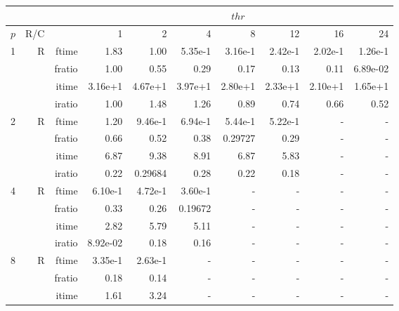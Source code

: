 \documentclass[a4paper]{article}
\begin{document}
\begin{table}[htbp]
\begin{center}
\begin{small}
\begin{tabular}{|r|r|r|r|r|r|r|r|r|r|}
\hline 
     & & & \multicolumn{7}{c|}{$thr$} \\ \hline
    $p$ & R/C &  & 1           & 2    & 4    & 8    & 12   & 16    & 24  \\ \hline\hline
   1 &  R &   ftime &    1.83  &    1.00 &    5.35e-1 &    3.16e-1 &    2.42e-1 &    2.02e-1 &    1.26e-1 \\
             &             &  fratio &    1.00 &    0.55 &    0.29 &    0.17 &    0.13 &    0.11 &    6.89e-02\\
             &             &  itime &    3.16e+1 &   4.67e+1 &   3.97e+1 &   2.80e+1 &   2.33e+1 &   2.10e+1 &   1.65e+1 \\
             &             &  iratio &    1.00 &    1.48  &    1.26  &   0.89 &    0.74 &    0.66 &    0.52 \\\hline
   2 &  R &   ftime &    1.20  &    9.46e-1 &    6.94e-1 &    5.44e-1 &    5.22e-1 &      - &      - \\
             &             &  fratio &    0.66 &   0.52 &    0.38 &    0.29727 &   0.29 &      - &      - \\
             &             &  itime &    6.87  &    9.38  &    8.91  &    6.87  &    5.83  &      - &      - \\
             &             &  iratio &   0.22 &    0.29684 &    0.28 &   0.22 &    0.18 &      - &      - \\\hline
   4 &  R &   ftime &    6.10e-1 &    4.72e-1 &    3.60e-1 &      - &      - &      - &      - \\
             &             &  fratio &    0.33 &    0.26 &    0.19672 &      - &      - &      - &      - \\
             &             &  itime &    2.82  &    5.79  &    5.11  &      - &      - &      - &      - \\
             &             &  iratio &    8.92e-02 &   0.18 &    0.16 &      - &      - &      - &      - \\\hline
   8 &   R &   ftime &    3.35e-1 &    2.63e-1 &      - &      - &      - &      - &      - \\
             &             &  fratio &    0.18 &    0.14 &      - &      - &      - &      - &      - \\
             &             &  itime &    1.61  &    3.24  &      - &      - &      - &      - &      - \\

\end{tabular}
\end{small}
\end{center}
\end{table}
\end{document}
